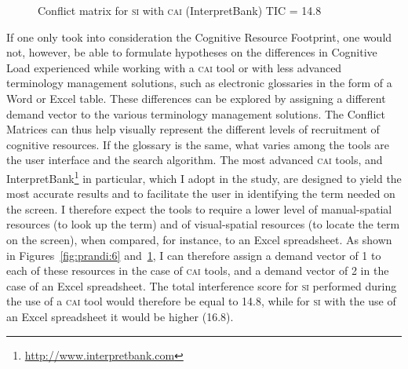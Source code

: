 \documentclass[output=paper]{langsci/langscibook}
\begin{document}
\begin{figure}[p]
{}
\caption{Conflict matrix for \textsc{si} with \textsc{cai} (InterpretBank) TIC = 14.8\label{fig:prandi:7}}
\end{figure}


If one only took into consideration the Cognitive Resource Footprint, one would not, however, be able to formulate hypotheses on the differences in Cognitive Load experienced while working with a \textsc{cai} tool or with less advanced terminology management solutions, such as electronic glossaries in the form of a Word or Excel table. These differences can be explored by assigning a different demand vector to the various terminology management solutions. The Conflict Matrices can thus help visually represent the different levels of recruitment of cognitive resources. If the glossary is the same, what varies among the tools are the user interface and the search algorithm. The most advanced \textsc{cai} tools, and InterpretBank\footnote{\url{http://www.interpretbank.com}} in particular, which I adopt in the study, are designed to yield the most accurate results and to facilitate the user in identifying the term needed on the screen. I therefore expect the tools to require a lower level of manual-spatial resources (to look up the term) and of visual-spatial resources (to locate the term on the screen), when compared, for instance, to an Excel spreadsheet. As shown in Figures~\ref{fig:prandi:6} and~\ref{fig:prandi:7}, I can therefore assign a demand vector of 1 to each of these resources in the case of \textsc{cai} tools, and a demand vector of 2 in the case of an Excel spreadsheet. The total interference score for \textsc{si} performed during the use of a \textsc{cai} tool would therefore be equal to 14.8, while for \textsc{si} with the use of an Excel spreadsheet it would be higher (16.8).
\end{document}
